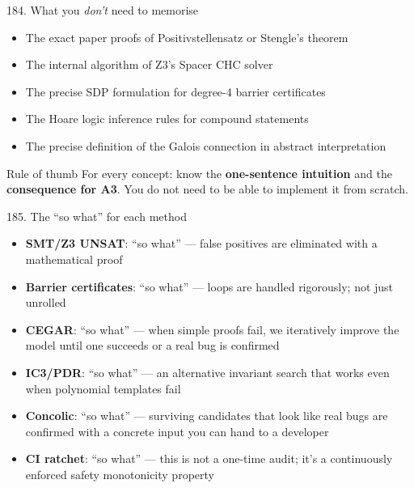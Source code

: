 \documentclass[aspectratio=169]{beamer}
\begin{document}
\begin{frame}{184. What you \textit{don't} need to memorise}
\begin{itemize}
  \item The exact paper proofs of Positivstellensatz or Stengle's theorem
  \item The internal algorithm of Z3's Spacer CHC solver
  \item The precise SDP formulation for degree-4 barrier certificates
  \item The Hoare logic inference rules for compound statements
  \item The precise definition of the Galois connection in abstract interpretation
\end{itemize}
\begin{block}{Rule of thumb}
For every concept: know the \textbf{one-sentence intuition} and the \textbf{consequence for A3}.
You do not need to be able to implement it from scratch.
\end{block}
\end{frame}

\begin{frame}{185. The ``so what'' for each method}
\begin{itemize}
  \item \textbf{SMT/Z3 UNSAT}: ``so what'' --- false positives are eliminated with a mathematical proof
  \item \textbf{Barrier certificates}: ``so what'' --- loops are handled rigorously; not just unrolled
  \item \textbf{CEGAR}: ``so what'' --- when simple proofs fail, we iteratively improve the model until one succeeds or a real bug is confirmed
  \item \textbf{IC3/PDR}: ``so what'' --- an alternative invariant search that works even when polynomial templates fail
  \item \textbf{Concolic}: ``so what'' --- surviving candidates that look like real bugs are confirmed with a concrete input you can hand to a developer
  \item \textbf{CI ratchet}: ``so what'' --- this is not a one-time audit; it's a continuously enforced safety monotonicity property
\end{itemize}
\end{frame}
\end{document}
